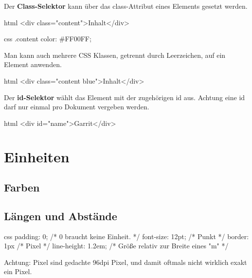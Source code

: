 \documentclass[10pt,a4paper]{article}
\begin{document}
\begin{multicols}{3}
Der \textbf{Class-Selektor} kann über das class-Attribut eines Elements gesetzt werden.
\begin{codebox}{html}{}
<div class="content">Inhalt</div>
\end{codebox}
\begin{codebox}{css}{}
.content {
  color: #FF00FF;
}
\end{codebox}
Man kann auch mehrere CSS Klassen, getrennt durch Leerzeichen, auf ein Element anwenden.
\begin{codebox}{html}{}
<div class="content blue">Inhalt</div>
\end{codebox}

Der \textbf{id-Selektor} wählt das Element mit der zugehörigen id aus. Achtung eine id darf nur einmal pro Dokument vergeben werden.
\begin{codebox}{html}{}
<div id="name">Garrit</div>
\end{codebox}


\section*{Einheiten}
\subsection*{Farben}

\subsection*{Längen und Abstände}
\begin{codebox}{css}{}
padding: 0;       /* 0 braucht keine Einheit. */
font-size: 12pt;  /* Punkt */
border: 1px       /* Pixel */
line-height: 1.2em; /* Größe relativ zur Breite eines "m" */
\end{codebox}

Achtung: Pixel sind gedachte 96dpi Pixel, und damit oftmals nicht wirklich exakt ein Pixel.



\end{multicols}
\end{document}
